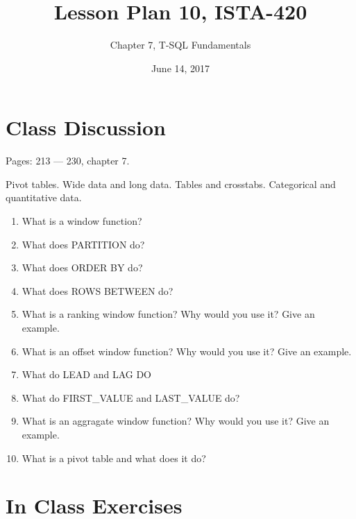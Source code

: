 \documentclass{article}
\title{Lesson Plan 10, ISTA-420}
\author{Chapter 7, T-SQL Fundamentals}
\date{June 14, 2017}
\begin{document}
    

    \maketitle{}

    \section{Class Discussion}

    Pages: 213 --- 230, chapter 7.

    Pivot tables. Wide data and long data. Tables and crosstabs. Categorical and quantitative data.

    \begin{enumerate}
        \item What is a window function?
        \item What does PARTITION do?
        \item What does ORDER BY do?
        \item What does ROWS BETWEEN do?
        \item What is a ranking window function? Why would you use it? Give an example.
        \item What is an offset window function? Why would you use it? Give an example.
        \item What do LEAD and LAG DO
        \item What do FIRST\_VALUE and LAST\_VALUE do?
        \item What is an aggragate window function? Why would you use it? Give an example.
        \item What is a pivot table and what does it do?
    \end{enumerate}

    \section{In Class Exercises}
\end{document}
